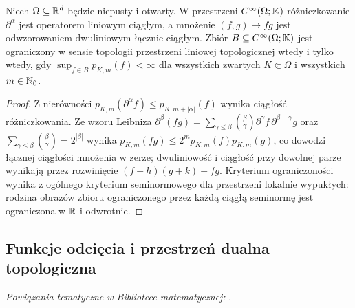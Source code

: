 \begin{stwierdzenie}
\label{prop:operations-cinf17}
Niech $\Omega\subseteq\mathbb R^d$ będzie niepusty i otwarty.
W przestrzeni $C^\infty(\Omega;\mathbb K)$ różniczkowanie
$\partial^\alpha$ jest operatorem liniowym ciągłym,
a mnożenie $(f,g)\mapsto fg$ jest odwzorowaniem dwuliniowym
łącznie ciągłym. Zbiór $B\subseteq C^\infty(\Omega;\mathbb K)$
jest ograniczony w sensie topologii przestrzeni liniowej
topologicznej wtedy i tylko wtedy, gdy
$\sup_{f\in B}p_{K,m}(f)<\infty$ dla wszystkich zwartych
$K\Subset\Omega$ i wszystkich $m\in\mathbb N_0$.
\end{stwierdzenie}
\begin{proof}
Z nierówności $p_{K,m}(\partial^\alpha f)\le p_{K,m+|\alpha|}(f)$
wynika ciągłość różniczkowania. Ze wzoru Leibniza
$\partial^\beta(fg)=\sum_{\gamma\le\beta}\binom{\beta}{\gamma}
\partial^\gamma f\,\partial^{\beta-\gamma}g$
oraz $\sum_{\gamma\le\beta}\binom{\beta}{\gamma}=2^{|\beta|}$
wynika $p_{K,m}(fg)\le 2^m p_{K,m}(f)p_{K,m}(g)$,
co dowodzi łącznej ciągłości mnożenia w zerze;
dwuliniowość i ciągłość przy dowolnej parze wynikają przez
rozwinięcie $(f+h)(g+k)-fg$. Kryterium ograniczoności
wynika z ogólnego kryterium seminormowego dla przestrzeni
lokalnie wypukłych: rodzina obrazów zbioru ograniczonego przez
każdą ciągłą seminormę jest ograniczona w $\mathbb R$ i odwrotnie.
\end{proof}

\subsection{Funkcje odcięcia i przestrzeń dualna topologiczna}

\noindent\emph{Powiązania tematyczne w Bibliotece matematycznej:} .


